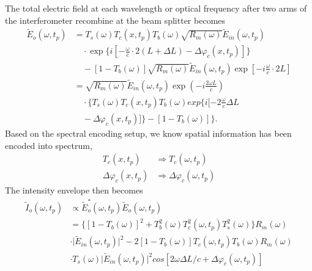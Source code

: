 \documentclass[aps,pra,reprint,longbibliography,superscriptaddress]{revtex4-1}
\begin{document}
The total electric field at each wavelength or optical frequency after two arms of the interferometer recombine at the beam splitter becomes
\begin{equation} \label{eq:totalElecField}
\begin{split}
\tilde{E}_o(\omega, t_p) &= T_s(\omega) T_c(x, t_p) T_b(\omega) \sqrt{R_m(\omega)} \tilde{E}_{in}(\omega, t_p) \\
&\quad \cdot \exp \Big\lbrace i[-\frac{\omega}{c} \cdot 2(L+\Delta L) - \Delta\varphi_c(x,t_p)] \Big\rbrace \\
&\quad - [1-T_b(\omega)] \sqrt{R_m(\omega)} \tilde{E}_{in}(\omega, t_p) \exp[- i \frac{\omega}{c}\cdot 2L] \\
&= \sqrt{R_m(\omega)} \tilde{E}_{in}(\omega, t_p) \exp(- i \frac{2\omega L}{c}) \\
&\quad \cdot \Big\lbrace T_s(\omega) T_c(x, t_p) T_b(\omega) exp \lbrace i[-2\frac{\omega}{c}\Delta L  \\
&\quad - \Delta\varphi_c(x,t_p)] \rbrace - [1-T_b(\omega)] \Big\rbrace.
\end{split}
\end{equation}
Based on the spectral encoding setup, we know spatial information has been encoded into spectrum,
\begin{align}
T_c(x,t_p) &\Rightarrow T_c(\omega,t_p)\\
\Delta\varphi_c(x,t_p) &\Rightarrow \Delta\varphi_c(\omega,t_p)
\end{align}
The intensity envelope then becomes
\begin{equation} \label{eq:totalIntensity}
\begin{split}
\tilde{I}_o(\omega, t_p) &\propto \tilde{E}_o^*(\omega, t_p) \tilde{E}_o(\omega, t_p) \\
&= \Big\lbrace [1-T_b(\omega)]^2 + T_b^2(\omega) T_c^2(\omega, t_p) T_s^2(\omega) \Big\rbrace R_m(\omega) \\
& \cdot \lvert\tilde{E}_{in}(\omega, t_p)\rvert^2 - 2 [1-T_b(\omega)] T_c(\omega, t_p) T_b(\omega) R_m(\omega) \\
& \cdot T_s(\omega) \lvert\tilde{E}_{in}(\omega, t_p)\rvert^2 cos[2\omega \Delta L / c + \Delta \varphi_c(\omega, t_p) ]
\end{split}
\end{equation}
\end{document}
